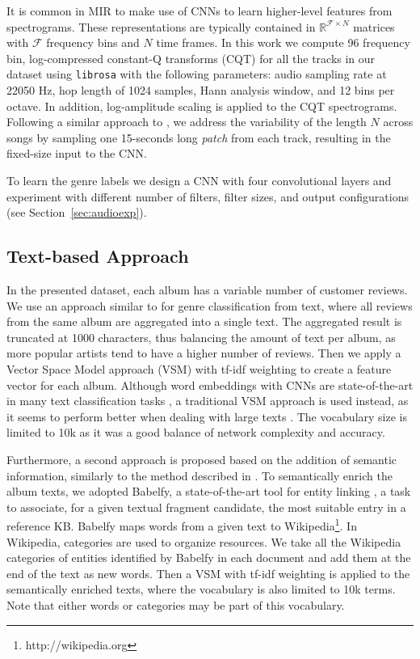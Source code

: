 \documentclass{article}
\begin{document}
It is common in MIR to make use of CNNs to learn higher-level features from spectrograms. 
These representations are typically contained in $\mathbb{R}^{\mathcal{F} \times N}$ matrices with $\mathcal{F}$ frequency bins and $N$ time frames.
In this work we compute 96 frequency bin, log-compressed constant-Q transforms (CQT) \cite{Schorkhuber2010} for all the tracks in our dataset using \texttt{librosa} \cite{Mcfee2015} with the following parameters: audio sampling rate at 22050 Hz, hop length of 1024 samples, Hann analysis window, and 12 bins per octave.
In addition, log-amplitude scaling is applied to the CQT spectrograms.
Following a similar approach to \cite{Oord2013}, we address the variability of the length $N$ across songs by sampling one 15-seconds long \emph{patch} from each track, resulting in the fixed-size input to the CNN.

To learn the genre labels we design a CNN with four convolutional layers and experiment with different number of filters, filter sizes, and output configurations (see Section~\ref{sec:audioexp}).












\subsection{Text-based Approach}
\label{sec:text}
In the presented dataset, each album has a variable number of customer reviews. 
We use an approach similar to \cite{hu2005mining,oramas2016exploring} for genre classification from text, where all reviews from the same album are aggregated into a single text. 
The aggregated result is truncated at 1000 characters, thus balancing the amount of text per album, as more popular artists tend to have a higher number of reviews. Then we apply a Vector Space Model approach (VSM) with tf-idf weighting \cite{Zobel1998} to create a feature vector for each album. 
Although word embeddings \cite{Mikolov2013} with CNNs are state-of-the-art in many text classification tasks \cite{Kim2014}, a traditional VSM approach is used instead, as it seems to perform better when dealing with large texts \cite{Oramas2017}.
The vocabulary size is limited to 10k as it was a good balance of network complexity and accuracy.

Furthermore, a second approach is proposed based on the addition of semantic information, similarly to the method described in \cite{oramas2016exploring}. 
To semantically enrich the album texts, we adopted Babelfy, a state-of-the-art tool for entity linking \cite{Moroetal2014}, a task to associate, for a given textual fragment candidate, the most suitable entry in a reference KB. 
Babelfy maps words from a given text to Wikipedia\footnote{http://wikipedia.org}. 
In Wikipedia, categories are used to organize resources. We take all the Wikipedia categories of entities identified by Babelfy in each document and add them at the end of the text as new words. 
Then a VSM with tf-idf weighting is applied to the semantically enriched texts, where the vocabulary is also limited to 10k terms. 
Note that either words or categories may be part of this vocabulary. 
\end{document}
